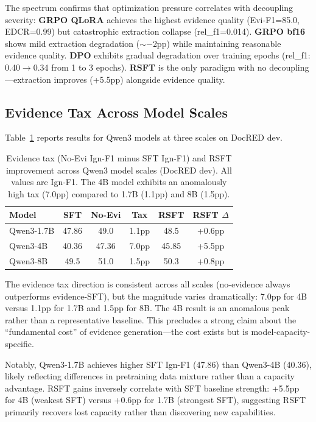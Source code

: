 \documentclass[11pt,a4paper]{article}
\newcommand{\edcr}{EDCR}
\begin{document}
The spectrum confirms that optimization pressure correlates with decoupling severity:
\textbf{GRPO QLoRA} achieves the highest evidence quality (Evi-F1=85.0, \edcr{}=0.99) but catastrophic extraction collapse (rel\_f1=0.014).
\textbf{GRPO bf16} shows mild extraction degradation ($\sim$$-$2pp) while maintaining reasonable evidence quality.
\textbf{DPO} exhibits gradual degradation over training epochs (rel\_f1: 0.40$\to$0.34 from 1 to 3 epochs).
\textbf{RSFT} is the only paradigm with no decoupling---extraction improves (+5.5pp) alongside evidence quality.

\subsection{Evidence Tax Across Model Scales}
\label{sec:model_scale}

Table~\ref{tab:model_scale} reports results for Qwen3 models at three scales on DocRED dev.

\begin{table}[t]
\centering
\small
\begin{tabular}{lccccc}
\toprule
\textbf{Model} & \textbf{SFT} & \textbf{No-Evi} & \textbf{Tax} & \textbf{RSFT} & \textbf{RSFT $\Delta$} \\
\midrule
Qwen3-1.7B & 47.86 & 49.0 & 1.1pp & 48.5 & +0.6pp \\
Qwen3-4B & 40.36 & 47.36 & 7.0pp & 45.85 & +5.5pp \\
Qwen3-8B & 49.5 & 51.0 & 1.5pp & 50.3 & +0.8pp \\
\bottomrule
\end{tabular}
\caption{Evidence tax (No-Evi Ign-F1 minus SFT Ign-F1) and RSFT improvement across Qwen3 model scales (DocRED dev). All values are Ign-F1. The 4B model exhibits an anomalously high tax (7.0pp) compared to 1.7B (1.1pp) and 8B (1.5pp).}
\label{tab:model_scale}
\end{table}

The evidence tax direction is consistent across all scales (no-evidence always outperforms evidence-SFT), but the magnitude varies dramatically: 7.0pp for 4B versus 1.1pp for 1.7B and 1.5pp for 8B.
The 4B result is an anomalous peak rather than a representative baseline.
This precludes a strong claim about the ``fundamental cost'' of evidence generation---the cost exists but is model-capacity-specific.

Notably, Qwen3-1.7B achieves higher SFT Ign-F1 (47.86) than Qwen3-4B (40.36), likely reflecting differences in pretraining data mixture rather than a capacity advantage.
RSFT gains inversely correlate with SFT baseline strength: +5.5pp for 4B (weakest SFT) versus +0.6pp for 1.7B (strongest SFT), suggesting RSFT primarily recovers lost capacity rather than discovering new capabilities.
\end{document}
